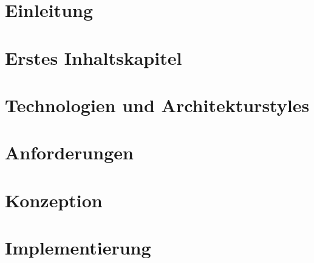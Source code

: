 \chapter{Einleitung}
	

\chapter{Erstes Inhaltskapitel}
	

\chapter{Technologien und Architekturstyles}
	

\chapter{Anforderungen}
	

\chapter{Konzeption}



\chapter{Implementierung}
	

